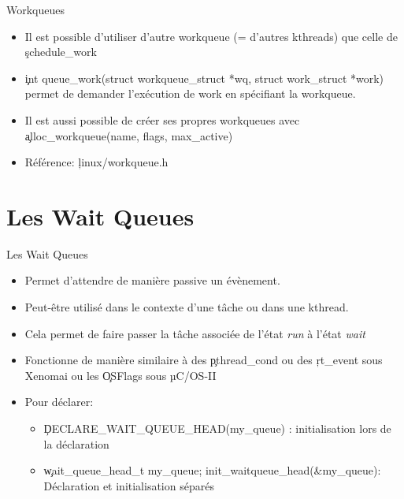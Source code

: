 \begin{frame}[fragile=singleslide]{Workqueues}
  \begin{itemize} 
  \item  Il  est possible  d'utiliser  d'autre  workqueue (=  d'autres
    kthreads) que celle de \c{schedule_work}
  \item
    \c{int queue_work(struct workqueue_struct *wq, struct work_struct *work)}
    permet de demander l'exécution de work en spécifiant la workqueue.
  \item  Il est  aussi possible  de créer  ses propres  workqueues avec
    \c{alloc_workqueue(name, flags, max_active)}
  \item Référence: \c{linux/workqueue.h}
  \end{itemize}
\end{frame}

\section{Les Wait Queues}

\begin{frame}[fragile=singleslide]{Les Wait Queues}
  \begin{itemize} 
  \item Permet d'attendre de manière passive un évènement. 
  \item Peut-être utilisé
    dans le contexte d'une tâche ou dans une kthread.
  \item  Cela permet  de  faire  passer la  tâche  associée de  l'état
    \emph{run} à l'état \emph{wait}
  \item Fonctionne de manière  similaire à des \c{pthread_cond} ou des
    \c{rt_event} sous Xenomai ou les \c{OSFlags} sous µC/OS-II
  \item Pour déclarer:
    \begin{itemize} 
    \item \c{DECLARE_WAIT_QUEUE_HEAD(my_queue)} : initialisation lors de
      la déclaration
    \item
      \c{wait_queue_head_t  my_queue; init_waitqueue_head(&my_queue)}:
      Déclaration et initialisation séparés
    \end{itemize} 
  \end{itemize}
\end{frame}

